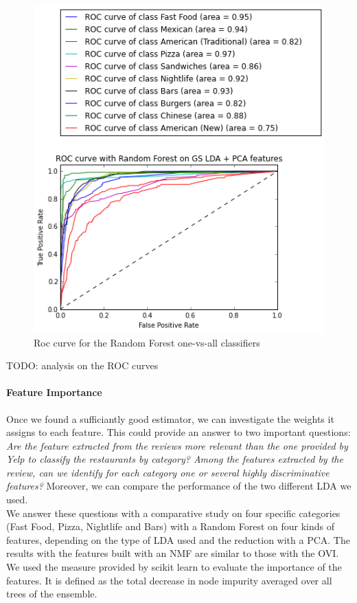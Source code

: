\documentclass[twoside]{article}
\begin{document}
\begin{multicols}{2}
\begin{figure}[H]
	\includegraphics[scale=0.55]{img/roc_rf.png}
	\centering
	\caption{Roc curve for the Random Forest one-vs-all classifiers}
\end{figure}

TODO: analysis on the ROC curves

\paragraph{Feature Importance}

Once we found a sufficiantly good estimator, we can investigate the weights it assigns to each feature. This could provide an answer to two important questions: \textit{Are the feature extracted from the reviews more relevant than the one provided by Yelp to classify the restaurants by category? Among the features extracted by the review, can we identify for each category one or several highly discriminative features?} Moreover, we can compare the performance of the two different LDA we used.\\

We answer these questions with a comparative study on four specific categories (Fast Food, Pizza, Nightlife and Bars) with a Random Forest on four kinds of features, depending on the type of LDA used and the reduction with a PCA. The results with the features built with an NMF are similar to those with the OVI. We used the measure provided by scikit learn to evaluate the importance of the features. It is defined as the total decrease in node impurity averaged over all trees of the ensemble.


\end{multicols}
\end{document}
